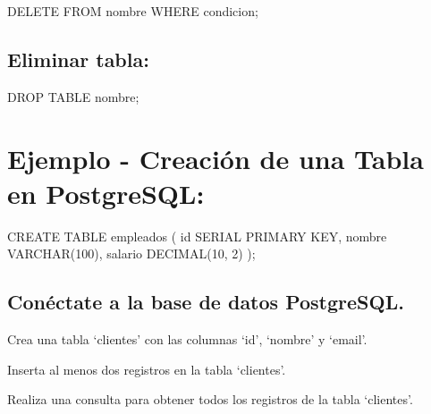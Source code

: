 \documentclass[
  a4paper,
  DIV=11,
  numbers=noendperiod,
  onepage,
  openany]{scrreprt}
\newenvironment{Shaded}{\begin{snugshade}}{\end{snugshade}}
\newcommand{\DataTypeTok}[1]{\textcolor[rgb]{0.68,0.00,0.00}{#1}}
\newcommand{\DecValTok}[1]{\textcolor[rgb]{0.68,0.00,0.00}{#1}}
\newcommand{\KeywordTok}[1]{\textcolor[rgb]{0.00,0.23,0.31}{#1}}
\newcommand{\NormalTok}[1]{\textcolor[rgb]{0.00,0.23,0.31}{#1}}
\begin{document}
\begin{Shaded}
\begin{Highlighting}[]
\KeywordTok{DELETE} \KeywordTok{FROM}\NormalTok{ nombre }\KeywordTok{WHERE}\NormalTok{ condicion;}
\end{Highlighting}
\end{Shaded}

\hypertarget{eliminar-tabla-2}{%
\subsection{Eliminar tabla:}\label{eliminar-tabla-2}}

\begin{Shaded}
\begin{Highlighting}[]
\KeywordTok{DROP} \KeywordTok{TABLE}\NormalTok{ nombre;}
\end{Highlighting}
\end{Shaded}

\hypertarget{ejemplo---creaciuxf3n-de-una-tabla-en-postgresql-2}{%
\section{Ejemplo - Creación de una Tabla en
PostgreSQL:}\label{ejemplo---creaciuxf3n-de-una-tabla-en-postgresql-2}}

\begin{Shaded}
\begin{Highlighting}[]
\KeywordTok{CREATE} \KeywordTok{TABLE}\NormalTok{ empleados (}
    \KeywordTok{id}\NormalTok{ SERIAL }\KeywordTok{PRIMARY} \KeywordTok{KEY}\NormalTok{,}
\NormalTok{    nombre }\DataTypeTok{VARCHAR}\NormalTok{(}\DecValTok{100}\NormalTok{),}
\NormalTok{    salario }\DataTypeTok{DECIMAL}\NormalTok{(}\DecValTok{10}\NormalTok{, }\DecValTok{2}\NormalTok{)}
\NormalTok{);}
\end{Highlighting}
\end{Shaded}

\begin{tcolorbox}[enhanced jigsaw, colbacktitle=quarto-callout-important-color!10!white, toprule=.15mm, leftrule=.75mm, titlerule=0mm, opacityback=0, rightrule=.15mm, opacitybacktitle=0.6, breakable, left=2mm, coltitle=black, title=\textcolor{quarto-callout-important-color}{\faExclamation}\hspace{0.5em}{Actividad Práctica}, toptitle=1mm, bottomtitle=1mm, arc=.35mm, bottomrule=.15mm, colback=white, colframe=quarto-callout-important-color-frame]

\hypertarget{conuxe9ctate-a-la-base-de-datos-postgresql.}{%
\section{Conéctate a la base de datos
PostgreSQL.}\label{conuxe9ctate-a-la-base-de-datos-postgresql.}}

Crea una tabla `clientes' con las columnas `id', `nombre' y `email'.

Inserta al menos dos registros en la tabla `clientes'.

Realiza una consulta para obtener todos los registros de la tabla
`clientes'.

\end{tcolorbox}
\end{document}
